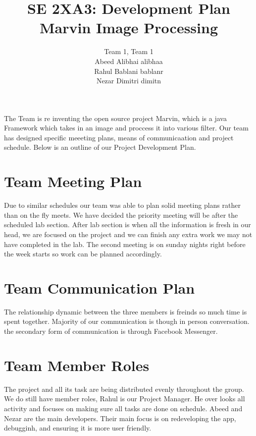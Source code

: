 \documentclass{article}
\begin{document}
\title{SE 2XA3: Development Plan \\ Marvin Image Processing}
\maketitle

\begin{center}
\author{Team 1, Team 1\\Abeed Alibhai alibhaa\\Rahul Bablani bablanr\\Nezar Dimitri dimitn}
\end{center}

The Team is re inventing the open source project Marvin, which is a java Framework which takes in an image and proccess it into various filter. Our team has designed specific meeeting plans, means of communicaation and project schedule. Below is an outline of our Project Development Plan.


\section{Team Meeting Plan}
Due to similar schedules our team was able to plan solid meeting plans rather than on the fly meets. We have decided the priority meeting will be after the scheduled lab section. After lab section is when all the information is fresh in our head, we are focused on the project and we can finish any extra work we may not have completed in the lab. The second meeting is on sunday nights right before the week starts so work can be planned accordingly.

\section{Team Communication Plan}
The relationship dynamic between the three members is freinds so much time is spent together. Majority of our communication is though in person conversation. the secondary form of communication is through Facebook Messenger.

\section{Team Member Roles}
The project and all its task are being distributed evenly throughout the group. We do still have member roles, Rahul is our Project Manager. He over looks all activity and focuses on making sure all tasks are done on schedule. Abeed and Nezar are the main developers. Their main focus is on redeveloping the app, debugginh,  and ensuring it is more user friendly.
\end{document}
